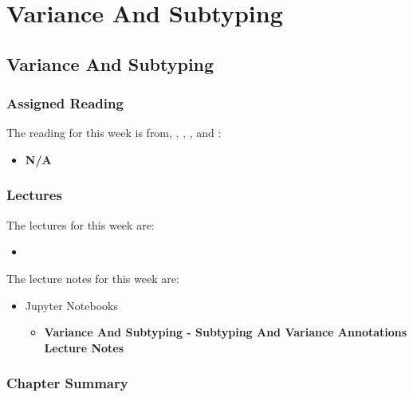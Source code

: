 \clearpage

\renewcommand{\ChapTitle}{Variance And Subtyping}
\renewcommand{\SectionTitle}{Variance And Subtyping}

\chapter{\ChapTitle}

\section{\SectionTitle}

\subsection{Assigned Reading}

The reading for this week is from, \AtomicScalaBook, \EssOfPPLBook, \FuncOfPPLBook, and \ProgInScalaBook:

\begin{itemize}
    \item \textbf{N/A}
\end{itemize}

\subsection{Lectures}

The lectures for this week are:

\begin{itemize}
    \item {}
\end{itemize}

\noindent The lecture notes for this week are:

\begin{itemize}
    \item Jupyter Notebooks
    \begin{itemize}
        \item \textbf{Variance And Subtyping - Subtyping And Variance Annotations Lecture Notes}
    \end{itemize}
\end{itemize}

\newpage

\subsection{Chapter Summary}

